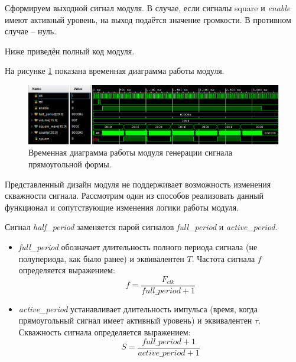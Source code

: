 \noindent
\begin{minipage}{\linewidth}
	
\end{minipage}

Сформируем выходной сигнал модуля. В случае, если сигналы square и \textit{enable} имеют активный уровень, на выход подаётся значение громкости. В противном случае -- нуль.

\noindent
\begin{minipage}{\linewidth}
	
\end{minipage}

Ниже приведён полный код модуля.

\noindent
\begin{minipage}{\linewidth}
	
\end{minipage}


На рисунке \ref{lab7:pic5} показана временная диаграмма работы модуля.

\begin{figure}[H]
	\centering
	\includegraphics [width=1\textwidth] {images/lab_7/square_simulate.PNG}
	\caption{Временная диаграмма работы модуля генерации сигнала прямоугольной формы.}
	\label{lab7:pic5}
\end{figure}


Представленный дизайн модуля не поддерживает возможность изменения скважности сигнала. Рассмотрим один из способов реализовать данный функционал и сопутствующие изменения логики работы модуля.

Сигнал \textit{half\_period} заменяется парой сигналов \textit{full\_period} и \textit{active\_period}. 

\begin{itemize}
\item \textit{full\_period} обозначает длительность полного периода сигнала (не полупериода, как было ранее) и эквивалентен $T$. Частота сигнала $f$ определяется выражением:
$$ f = \frac{F_{clk}}{\textit{full\_period} + 1} $$ 
\item \textit{active\_period} устанавливает длительность импульса (время, когда прямоугольный сигнал имеет активный уровень) и эквивалентен $\tau$. Скважность сигнала определяется выражением:
$$ S = \frac{\textit{full\_period} + 1}{\textit{active\_period} + 1} $$
\end{itemize}


